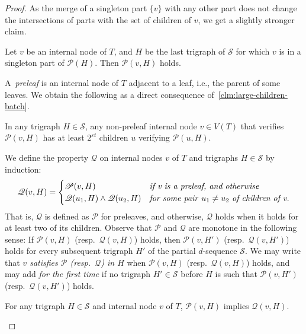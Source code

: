 \documentclass[a4paper,UKenglish,cleveref,hyperref,autoref]{lipics-v2021}
\newcommand{\prel}{preleaf\xspace}
\newcommand{\prels}{preleaves\xspace}
\begin{document}
\begin{proof}
 As the merge of a singleton part $\{v\}$ with any other part does not change the intersections of parts with the set of children of $v$, we get a slightly stronger claim.  
  \begin{claim}\label{clm:large-children-batch2}
   Let $v$ be an internal node of $T$, and $H$ be the last trigraph of $\mathcal S$ for which $v$ is in a singleton part of $\mathcal P(H)$.
   Then $\mathscr P(v,H)$ holds.
  \end{claim}
 
 A~\emph{\prel} is an internal node of $T$ adjacent to a leaf, i.e., the parent of some leaves. 
 We obtain the following as a direct consequence of~\cref{clm:large-children-batch}.

\begin{claim}\label{claim:hereditary}
 In any trigraph $H \in \mathcal S$, any non-\prel internal node $v \in V(T)$ that verifies $\mathscr P(v,H)$ has at least $2^{\varepsilon t}$ children $u$ verifying $\mathscr P(u,H)$.
 \end{claim}

We define the property $\mathscr Q$ on internal nodes $v$ of $T$ and trigraphs $H \in \mathcal S$ by induction:
\begin{align*}
  \mathscr Q(v,H) =
    \begin{cases}
      \mathscr P(v,H)                          & \text{\emph{if v is a \prel, and otherwise}}\\
      \mathscr Q(u_1,H) \land \mathscr Q(u_2,H) & \text{\emph{for some pair}}~u_1 \neq u_2~\text{\emph{of children of v.}}
    \end{cases}       
\end{align*}
That is, $\mathscr Q$ is defined as $\mathscr P$ for \prels, and otherwise, $\mathscr Q$ holds when it holds for at least two of its children.
Observe that $\mathscr P$ and $\mathscr Q$ are monotone in the following sense:
If $\mathscr P(v,H)$ (resp.~$\mathscr Q(v,H)$) holds, then $\mathscr P(v,H')$ (resp.~$\mathscr Q(v,H')$) holds for every subsequent trigraph $H'$ of the partial $d$-sequence $\mathcal S$.
We may write that \emph{$v$ satisfies $\mathscr P$ (resp.~$\mathscr Q$) in $H$} when $\mathscr P(v,H)$ (resp.~$\mathscr Q(v,H)$) holds, and may add \emph{for the first time} if no trigraph $H' \in \mathcal S$ before $H$ is such that $\mathscr P(v,H')$ (resp.~$\mathscr Q(v,H')$) holds.  

 \begin{claim}\label{clm:p-implies-q}
 For any trigraph $H \in \mathcal S$ and internal node $v$ of $T$, $\mathscr P(v,H)$ implies $\mathscr Q(v,H)$.
 \end{claim}
 

\end{proof}
\end{document}
